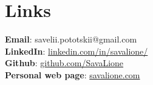 \documentclass[letterpaper,11pt]{article}
\begin{document}

\section{Links}
\begin{itemize}[leftmargin=0.15in, label={}]
    \normalsize{\item{
                    \textbf{Email}{:  savelii.pototskii@gmail.com} \\
                    \textbf{LinkedIn}{:  \href{https://linkedin.com/in/savalione/}{linkedin.com/in/savalione/}} \\
                    \textbf{Github}{:  \href{https://github.com/SavaLione}{github.com/SavaLione}} \\
                    \textbf{Personal web page}{: \href{https://savalione.com}{savalione.com} } \\
              }}
\end{itemize}
\end{document}
